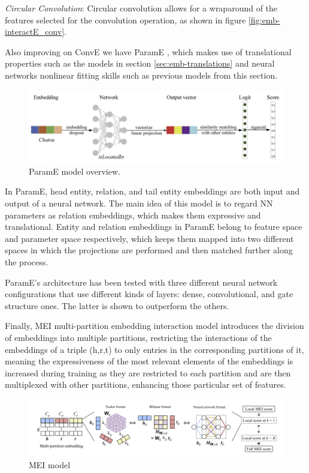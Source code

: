 \textit{Circular Convolution}: Circular convolution allows for a wraparound of the features selected for the convolution operation, as shown in figure \ref{fig:emb-interactE_conv}.

Also improving on ConvE we have ParamE \cite{che2020parame}, which makes use of translational properties such as the models in section \ref{sec:emb-translations} and neural networks nonlinear fitting skills such as previous models from this section.

\begin{figure}[!ht]
    \centering
    \includegraphics[width=\textwidth]{fig/embeddings/ParamE.png}
    \caption{ParamE\cite{che2020parame} model overview.}
    \label{fig:emb-paramE}
\end{figure}

In ParamE, head entity, relation, and tail entity embeddings are both input and output of a neural network. The main idea of this model is to regard NN parameters as relation embeddings, which makes them expressive and translational. Entity and relation embeddings in ParamE belong to feature space and parameter space respectively, which keeps them mapped into two different spaces in which the projections are performed and then matched further along the process.

ParamE's architecture has been tested with three different neural network configurations that use different kinds of layers: dense, convolutional, and gate structure ones. The latter is shown to outperform the others.

Finally, MEI \cite{tran2020multi} multi-partition embedding interaction model introduces the division of embeddings into multiple partitions, restricting the interactions of the embeddings of a triple (h,r,t) to only entries in the corresponding partitions of it, meaning the expressiveness of the most relevant elements of the embeddings is increased during training as they are restricted to each partition and are then multiplexed with other partitions, enhancing those particular set of features.

\begin{figure}[!ht]
    \centering
    \includegraphics[width=\textwidth]{fig/embeddings/MEI.png}
    \caption{MEI model \cite{tran2020multi}}
    \label{fig:emb-MEI}
\end{figure}

